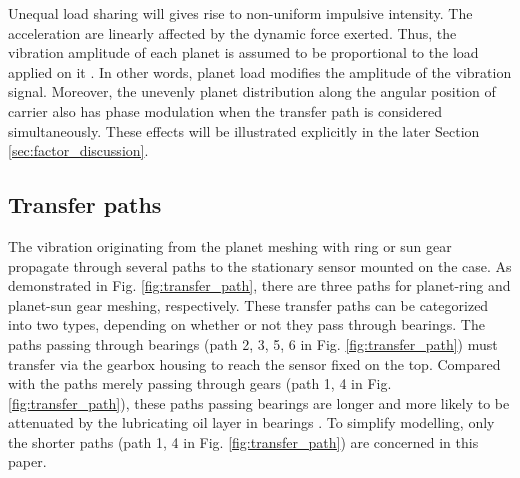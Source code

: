 \documentclass[a4paper,fleqn]{cas-sc}%
\begin{document}
\par Unequal load sharing will gives rise to non-uniform impulsive intensity. The acceleration are linearly affected by the dynamic force exerted. Thus, the vibration amplitude of each planet is assumed to be proportional to the load applied on it \cite{Inalpolat2009}. In other words, planet load modifies the amplitude of the vibration signal. Moreover, the unevenly planet distribution along the angular position of carrier also has phase modulation when the transfer path is considered simultaneously. These effects will be illustrated explicitly in the later Section \ref{sec:factor_discussion}. 
\subsection{Transfer paths\label{sec:transfer_path}}
\par The vibration originating from the planet meshing with ring or sun gear propagate through several paths to the stationary sensor mounted on the case. As demonstrated in Fig. \ref{fig:transfer_path}, there are three paths for planet-ring and planet-sun gear meshing, respectively. These transfer paths can be categorized into two types, depending on whether or not they pass through bearings. The paths passing through bearings (path 2, 3, 5, 6 in Fig. \ref{fig:transfer_path}) must transfer via the gearbox housing to reach the sensor fixed on the top. Compared with the paths merely passing through gears (path 1, 4 in Fig. \ref{fig:transfer_path}), these paths passing bearings are longer and more likely to be attenuated by the lubricating oil layer in bearings \cite{Feng2012}. To simplify modelling, only the shorter paths (path 1, 4 in Fig. \ref{fig:transfer_path}) are concerned in this paper.
\end{document}

